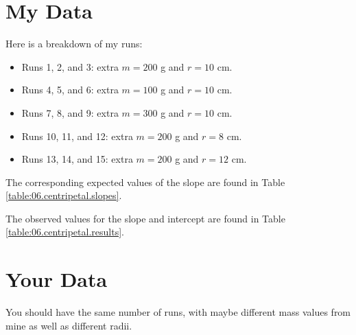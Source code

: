 \section{My Data}
%
Here is a breakdown of my runs:
\begin{itemize}
    \item Runs 1, 2, and 3: extra $m = 200$ g and $r = 10$ cm.
    \item Runs 4, 5, and 6: extra $m = 100$ g and $r = 10$ cm.
    \item Runs 7, 8, and 9: extra $m = 300$ g and $r = 10$ cm.
    \item Runs 10, 11, and 12: extra $m = 200$ g and $r = 8$ cm.
    \item Runs 13, 14, and 15: extra $m = 200$ g and $r = 12$ cm.
\end{itemize}
The corresponding expected values of the slope are found in Table \ref{table:06.centripetal.slopes}.

The observed values for the slope and intercept are found in Table \ref{table:06.centripetal.results}.
%
\section{Your Data}
%
You should have the same number of runs, with maybe different mass values from mine as well as different radii.
%
\newpage
